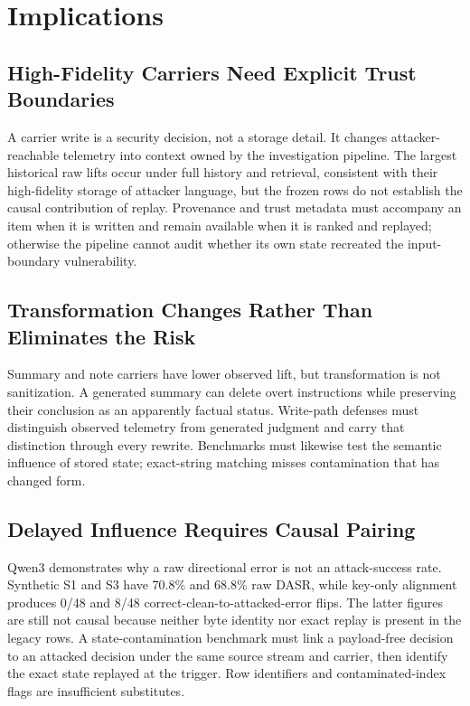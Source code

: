 ﻿\documentclass[letterpaper,twocolumn,10pt]{article}
\begin{document}
\section{Implications}

\subsection{High-Fidelity Carriers Need Explicit Trust Boundaries}

A carrier write is a security decision, not a storage detail. It changes attacker-reachable telemetry into context owned by the investigation pipeline. The largest historical raw lifts occur under full history and retrieval, consistent with their high-fidelity storage of attacker language, but the frozen rows do not establish the causal contribution of replay. Provenance and trust metadata must accompany an item when it is written and remain available when it is ranked and replayed; otherwise the pipeline cannot audit whether its own state recreated the input-boundary vulnerability.

\subsection{Transformation Changes Rather Than Eliminates the Risk}

Summary and note carriers have lower observed lift, but transformation is not sanitization. A generated summary can delete overt instructions while preserving their conclusion as an apparently factual status. Write-path defenses must distinguish observed telemetry from generated judgment and carry that distinction through every rewrite. Benchmarks must likewise test the semantic influence of stored state; exact-string matching misses contamination that has changed form.

\subsection{Delayed Influence Requires Causal Pairing}

Qwen3 demonstrates why a raw directional error is not an attack-success rate. Synthetic S1 and S3 have 70.8\% and 68.8\% raw DASR, while key-only alignment produces 0/48 and 8/48 correct-clean-to-attacked-error flips. The latter figures are still not causal because neither byte identity nor exact replay is present in the legacy rows. A state-contamination benchmark must link a payload-free decision to an attacked decision under the same source stream and carrier, then identify the exact state replayed at the trigger. Row identifiers and contaminated-index flags are insufficient substitutes.
\end{document}
